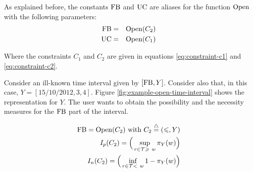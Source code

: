 
As explained before, the constants $\operatorname{FB}$ and $\operatorname{UC}$ are aliases for the function $\operatorname{Open}$ with the following parameters:
\begin{eqnarray}
\operatorname{FB} &=& \operatorname{Open}(C_2)\\
\operatorname{UC} &=& \operatorname{Open}(C_1)
\end{eqnarray}

Where the constraints $C_1$ and $C_2$ are given in equations \eqref{eq:constraint-c1} and \eqref{eq:constraint-c2}.

\begin{example}
\label{ex:open-time-interval}
Consider an ill-known time interval given by $\left[\operatorname{FB}, Y \right]$. Consider also that, in this case, $Y= \left[15/10/2012,3,4 \right] $. Figure \ref{fig:example-open-time-interval} shows the representation for $Y$. The user wants to obtain the possibility and the necessity measures for the $\operatorname{FB}$ part of the interval.
\end{example}

\begin{eqnarray}
\nonumber
\operatorname{FB} = \operatorname{Open}(C_2) \mbox{ with } C_2\stackrel{\triangle}{=}\left(\leqslant,Y\right)\\
\nonumber
I_p(C_2)= \Big(\sup_{r\in\mathcal{T} \geqslant\  w}\pi_{Y}(w)\Big)\\
\nonumber
I_n(C_2) = \Big(\inf_{r\in\mathcal{T} <\  w}1-\pi_{Y}(w)\Big)
\end{eqnarray}


